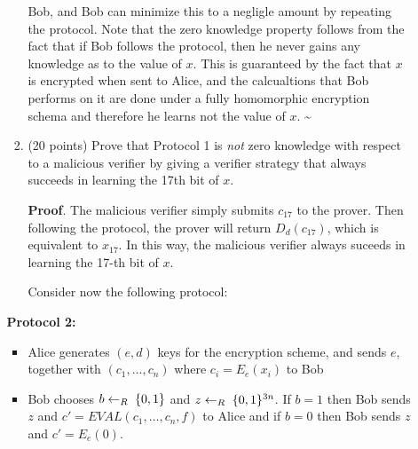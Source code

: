 \documentclass{article}
\begin{document}
\begin{enumerate}
\begin{itemize}
\begin{enumerate}[noitemsep,topsep=\mdcompacttopsep,label=\alph*.]
Bob, and Bob can minimize this to a negligle amount by repeating the protocol.
Note that the zero knowledge property follows from the fact that if Bob follows the protocol,
then he never gains any knowledge as to the value of $x$. This is guaranteed by the fact that
$x$ is encrypted when sent to Alice, and the calcualtions that Bob performs on it are done
under a fully homomorphic encryption schema and therefore he learns not the value of $x$. 
\textasciitilde{}%

\item{}(20 points) Prove that Protocol 1 is \emph{not} zero knowledge with respect to a malicious verifier by giving a verifier strategy that always succeeds in learning the 17th bit of $x$.

\begin{mdbmarginx}{1ex}{0pt}{1ex}{0pt}%
\noindent{}\textbf{Proof}.  The malicious verifier simply submits $c_{17}$ to the prover. Then following the protocol,
the prover will return $D_d(c_{17})$, which is equivalent to $x_{17}.$ In this way, the
malicious verifier always suceeds in learning the 17-th bit of $x$.%
\end{mdbmarginx}%
Consider now the following protocol:%
\end{enumerate}%

\textbf{Protocol 2:}%

\begin{itemize}%

\item{}
Alice generates $(e,d)$ keys for the encryption scheme, and sends $e$, together with $(c_1,\ldots,c_n)$ where $c_i =E_e(x_i)$ to Bob%

\item{}
Bob chooses $b\leftarrow_R\;\{0,1\}$ and $z\leftarrow_R\;\{0,1\}^{3n}$. If $b=1$ then Bob sends $z$ and $c'=EVAL(c_1,\ldots,c_n,f)$ to Alice and if $b=0$ then Bob sends $z$ and $c'=E_e(0)$.%


\end{itemize}
\end{itemize}
\end{enumerate}
\end{document}
